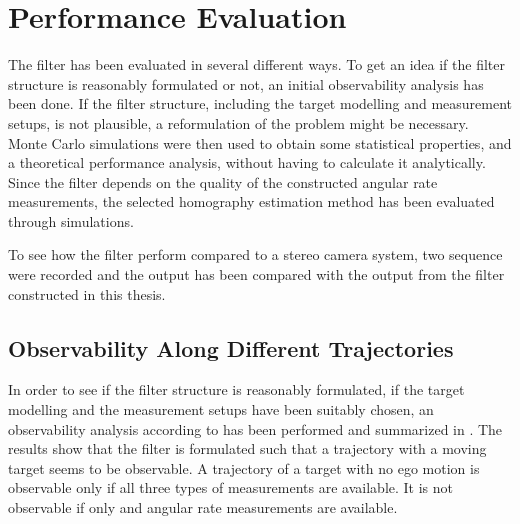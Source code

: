 \chapter{Performance Evaluation}
\label{cha:result}
The filter has been evaluated in several different ways.
To get an idea if the filter structure is reasonably formulated or not, an initial observability analysis has been done.
If the filter structure, including the target modelling and measurement setups, is not plausible, a reformulation of the problem might be necessary.
Monte Carlo simulations were then used to obtain some statistical properties, and a theoretical performance analysis, without having to calculate it analytically.
Since the filter depends on the quality of the constructed angular rate measurements, the selected homography estimation method has been evaluated through simulations.

To see how the filter perform compared to a stereo camera system, two sequence were recorded and the output has been compared with the output from the filter constructed in this thesis.

\section{Observability Along Different Trajectories}
\label{sec:observabilityresult}
In order to see if the filter structure is reasonably formulated, \ie if the target modelling and the measurement setups have been suitably chosen, an observability analysis according to  has been performed and summarized in .
The results show that the filter is formulated such that a trajectory with a moving target seems to be observable.
A trajectory of a target with no ego motion is observable only if all three types of measurements are available.
It is not observable if only \abbrROI and angular rate measurements are available.

